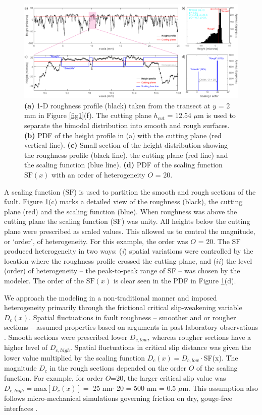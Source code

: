 \documentclass[preprint,1p, 10pt,authoryear]{elsarticle}
\begin{document}
\begin{figure}[ht]
	\centering
	\includegraphics{FIG3_revised.pdf} 
	\caption{ \textbf{(a)} 1-D roughness profile (black) taken from the transect at $y$ = 2 mm in Figure \ref{fig1}(f).  The cutting plane $h_{cut}$ = 12.54 $\mu$m is used to separate the bimodal distribution into smooth and rough surfaces. \textbf{(b)} PDF of the height profile in (a) with the cutting plane (red vertical line). \textbf{(c)} Small section of the height distribution showing the roughness profile (black line), the cutting plane (red line) and the scaling function (blue line). \textbf{(d)} PDF of the scaling function $\mathrm{SF}(x)$ with an order of heterogeneity $O$ = 20.}
	\label{fig3}
\end{figure}

A scaling function ($\mathrm{SF}$) is used to partition the smooth and rough sections of the fault. Figure \ref{fig3}(c) marks a detailed view of the roughness (black), the cutting plane (red) and the scaling function (blue). When roughness was above the cutting plane the scaling function ($\mathrm{SF}$) was unity. All heights below the cutting plane were prescribed as scaled values. This allowed us to control the magnitude, or `order', of heterogeneity. For this example, the order was $O$ = 20. The  $\mathrm{SF}$ produced heterogeneity in two ways: (\textit{i}) spatial variations were controlled by the location where the roughness profile crossed the cutting plane, and ($ii$) the level (order) of heterogeneity -- the peak-to-peak range of SF -- was chosen by the modeler. The order of the $\mathrm{SF}(x)$ is clear seen in the PDF in Figure \ref{fig3}(d).

We approach the modeling in a non-traditional manner and imposed heterogeneity primarily through the frictional critical slip-weakening variable $D_{c}(x)$. Spatial fluctuations in fault roughness -- smoother and or rougher sections -- assumed properties based on arguments in past laboratory observations \citep{Marone1994}. Smooth sections were prescribed lower $D_{c,low}$, whereas rougher sections have a higher level of $D_{c, high}$. Spatial fluctuations in critical slip distance was given the lower value multiplied by the scaling function $D_{c}(x) = D_{c,low}\cdot$SF(x). The magnitude $D_{c}$ in the rough sections depended on the order $O$ of the scaling function. For example, for order $O$=20, the larger critical slip value was $D_{c, high} = \textrm{max}[D_{c}(x)] =$ 25 nm$\cdot$ 20 = 500 nm = 0.5 $\mu$m. This assumption also follows micro-mechanical simulations governing friction on dry, gouge-free interfaces \citep{Yoshioka1996,Yoshioka1997}. 
\end{document}
